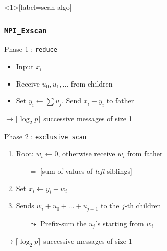 \documentclass[xcolor={rgb,x11names,svgnames},rgb,x11names,svgnames]{beamer}
\begin{document}


\begin{frame}<1>[label=scan-algo]
  \frametitle{\texttt{MPI\_Exscan}}
  
  \begin{exampleblock}{Phase 1 : \texttt{reduce}}
    \begin{itemize}
    \item Input $x_i$
    \item Receive $u_0,  u_1, \dots$ from children
    \item Set $y_i \gets \sum u_j$. Send $x_i + y_i$ to father
    \end{itemize}
  \end{exampleblock}

  $\rightarrow \lceil \log_2 p \rceil$ successive messages of size 1

  \pause
  
  \begin{alertblock}{Phase 2 : \texttt{exclusive scan}}
    \begin{enumerate}
    \item Root: $w_i \gets 0$, otherwise receive $w_i$ from father
      \begin{itemize}
      \item[$=$] [sum of values of \emph{left} siblings]
      \end{itemize}
    \item Set $x_i \gets y_i + w_i$
    \item Sends $w_i + u_0 + \dots + u_{j-1}$ to the $j$-th children
      \begin{itemize}
      \item[$\leadsto$] Prefix-sum the $u_j$'s starting from $w_i$
      \end{itemize}
    \end{enumerate}
  \end{alertblock}

  $\rightarrow \lceil \log_2 p \rceil$ successive messages of size 1
\end{frame}

\end{document}

